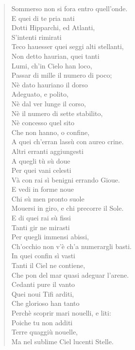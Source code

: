\documentclass[11pt,twoside,openany]{book}
\begin{document}
\begin{verse}
Sommerso non si fora entro quell'onde. \\[0.8em]
E quei di te pria nati \\
Dotti Hipparchi, ed Atlanti, \\
S'intenti rimirati \\
Teco hauesser quei seggi alti stellanti, \\
Non detto haurian, quei tanti \\
Lumi, ch'in Cielo han loco, \\
Passar di mille il numero di poco; \\[0.8em]
Nè dato hauriano il dorso \\
Adeguato, e polito, \\
Nè dal ver lunge il corso, \\
Nè il numero di sette stabilito, \\
Nè concesso quel sito \\
Che non hanno, o confine, \\
A quei ch'erran lassù con aureo crine. \\[0.8em]
Altri erranti aggiungesti \\
A quegli tù sù doue \\
Per quei vani celesti \\
Và con rai sì benigni errando Gioue. \\
E vedi in forme noue \\
Chi sù men pronto suole \\
Mouersi in giro, e chi precorre il Sole. \\[0.8em]
E di quei rai sù fissi \\
Tanti gir ne mirasti \\
Per quegli immensi abissi, \\
Ch'occhio non v'è ch'a numerargli basti. \\
In quei confin sì vasti \\
Tanti il Ciel ne contiene, \\
Che pon del mar quasi adeguar l'arene. \\[0.8em]
Cedanti pure il vanto \\
Quei noui Tifi arditi, \\
Che glorioso han tanto \\
Perchè scoprir mari nouelli, e liti: \\
Poiche tu non additi \\
Terre quaggiù nouelle, \\
Ma nel sublime Ciel lucenti Stelle. \\[0.8em]

\end{verse}
\end{document}
